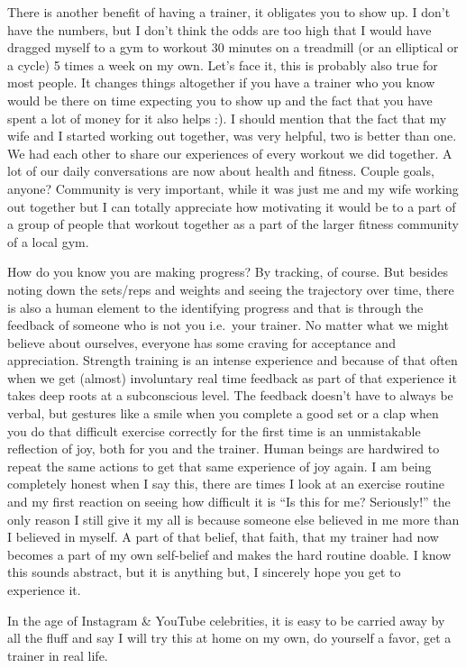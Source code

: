 \documentclass[
  oneside]{book}
\begin{document}
There is another benefit of having a trainer, it obligates you to show up. I don't have the numbers, but I don't think the odds are too high that I would have dragged myself to a gym to workout 30 minutes on a treadmill (or an elliptical or a cycle) 5 times a week on my own. Let's face it, this is probably also true for most people. It changes things altogether if you have a trainer who you know would be there on time expecting you to show up and the fact that you have spent a lot of money for it also helps :). I should mention that the fact that my wife and I started working out together, was very helpful, two is better than one. We had each other to share our experiences of every workout we did together. A lot of our daily conversations are now about health and fitness. Couple goals, anyone? Community is very important, while it was just me and my wife working out together but I can totally appreciate how motivating it would be to a part of a group of people that workout together as a part of the larger fitness community of a local gym.

How do you know you are making progress? By tracking, of course. But besides noting down the sets/reps and weights and seeing the trajectory over time, there is also a human element to the identifying progress and that is through the feedback of someone who is not you i.e.~your trainer. No matter what we might believe about ourselves, everyone has some craving for acceptance and appreciation. Strength training is an intense experience and because of that often when we get (almost) involuntary real time feedback as part of that experience it takes deep roots at a subconscious level. The feedback doesn't have to always be verbal, but gestures like a smile when you complete a good set or a clap when you do that difficult exercise correctly for the first time is an unmistakable reflection of joy, both for you and the trainer. Human beings are hardwired to repeat the same actions to get that same experience of joy again. I am being completely honest when I say this, there are times I look at an exercise routine and my first reaction on seeing how difficult it is ``Is this for me? Seriously!'' the only reason I still give it my all is because someone else believed in me more than I believed in myself. A part of that belief, that faith, that my trainer had now becomes a part of my own self-belief and makes the hard routine doable. I know this sounds abstract, but it is anything but, I sincerely hope you get to experience it.

In the age of Instagram \& YouTube celebrities, it is easy to be carried away by all the fluff and say I will try this at home on my own, do yourself a favor, get a trainer in real life.
\end{document}
